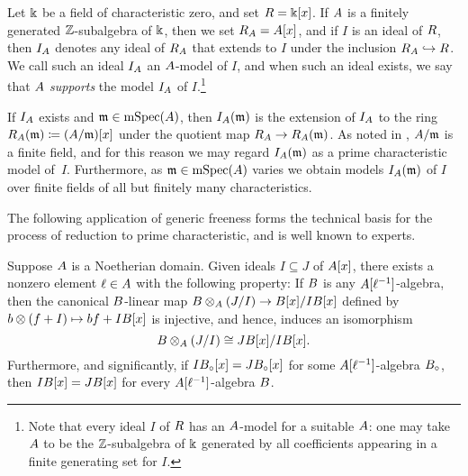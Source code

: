 \documentclass{amsart}
\begin{document}
\begin{definition}
   \label{reduction: D}
   Let $\Bbbk$ be a field of characteristic zero, and set $R = \Bbbk[x]$.
   If $A$ is a finitely generated $\mathbb{Z}$-subalgebra of $\Bbbk$, then we set $R_A = A[x]$, and if $I$ is an ideal of $R$, then $I_A$ denotes any ideal of $R_A$ that extends to $I$ under the inclusion $R_A \hookrightarrow R$.   We call such an ideal $I_A$ an $A$-model of $I$, and when such an ideal exists, we say that $A$ \emph{supports} {the model $I_A$ of $I$}.\footnote{Note that every ideal $I$ of $R$ has an $A$-model for a suitable $A$: one may take $A$ to be the $\mathbb{Z}$-subalgebra of $\Bbbk$ generated by all coefficients appearing in a finite generating set for $I$.}

   If $I_A$ exists and $\mathfrak{m} \in \operatorname{mSpec}(A)$, then $I_A(\mathfrak{m})$ is the extension of $I_A$ to the ring $R_{A}(\mathfrak{m}) \coloneqq (A/\mathfrak{m})[x]$ under the quotient map $R_A \to R_A(\mathfrak{m})$.
   As noted in , $A/\mathfrak{m}$ is a finite field, and for this reason we may regard $I_A(\mathfrak{m})$ as a prime characteristic model of~$I$.
   Furthermore, as $\mathfrak{m} \in \operatorname{mSpec}(A)$ varies we obtain models $I_A(\mathfrak{m})$ of $I$ over finite fields of all but finitely many characteristics.
\end{definition}

The following application of generic freeness forms the technical basis for the process of reduction to prime characteristic, and is well known to experts.  

\begin{proposition}
   \label{comparing expansions:  P}
   Suppose $A$ is a Noetherian domain.
   Given ideals $I \subseteq J$ of $A[x]$, there exists a nonzero element $\ell \in A$ with the following property\textup:
  If $B$ is any $A[\ell^{-1}]$-algebra, then the canonical $B$-linear map  $B \otimes_A (J/I) \to B[x]/I B[x]$ defined by $b \otimes (f+I) \mapsto bf+I B[x]$ is injective, and hence, induces an isomorphism \[ B \otimes_A (J/I) \cong J B[x] / I B[x].\]    
  Furthermore, and significantly, if $I B_{\circ}[x]=J B_{\circ}[x]$ for some $A[\ell^{-1}]$-algebra $B_{\circ}$, then $I B[x]=J B[x]$ for every $A[\ell^{-1}]$-algebra $B$.
  \end{proposition}
\end{document}
